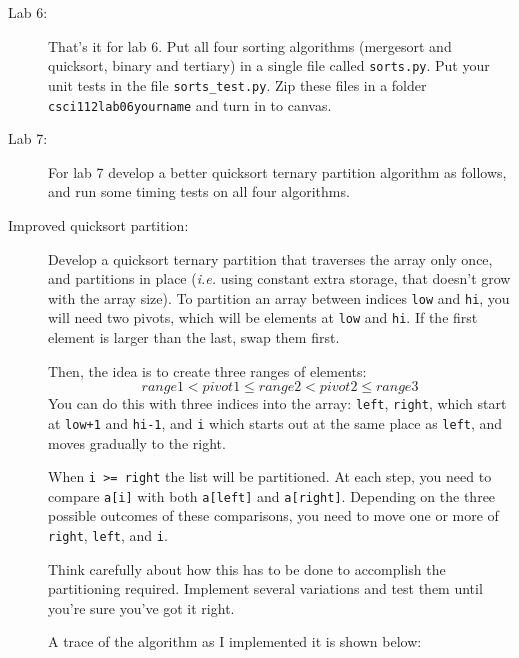 \documentclass{article}
\begin{document}
\begin{description}
\item[Lab 6:]  That's it for lab 6.   Put all four sorting algorithms (mergesort and quicksort, binary and
tertiary) in a single file called \verb|sorts.py|.  Put your unit tests in the file \verb|sorts_test.py|.  Zip these files in a folder \verb|csci112lab06yourname|
and turn in to canvas.

\item[Lab 7:]  For lab 7 develop a better quicksort ternary partition 
algorithm as follows, and run some timing tests on all four algorithms.

\item[Improved quicksort partition:] Develop a quicksort ternary partition that traverses
the array only once, and partitions in place ({\em i.e.} using constant extra storage,
that doesn't grow with the array size).  To partition
an array between indices \lstinline{low} and \lstinline{hi}, you will
need two pivots, which will be elements at \lstinline{low} and \lstinline{hi}.  If the
first element is larger than the last, swap them first.

Then, the idea is to create three ranges of elements:
\[ range1 < pivot1 \leq range2 < pivot2 \leq range3 \]
You can do this with three indices into the array: \lstinline{left}, \lstinline{right},
which start at \lstinline{low+1} and \lstinline{hi-1}, and \lstinline{i} which starts
out at the same place as \lstinline{left}, and moves gradually to the right.

When \lstinline{i >= right} the list will be partitioned.  At each step,
you need to compare \lstinline{a[i]} with both \lstinline{a[left]}
and \lstinline{a[right]}.  Depending on the three possible outcomes
of these comparisons, you need to move one or more of
\lstinline{right}, \lstinline{left}, and \lstinline{i}.

Think carefully about how this has to be done to accomplish the
partitioning required.  Implement several variations and test them
until you're sure you've got it right.

A trace of the algorithm as I implemented it is shown below:


\end{description}
\end{document}
